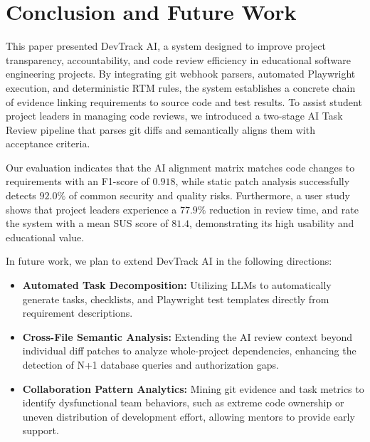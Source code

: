 \section{Conclusion and Future Work}
\label{sec:conclusion}

This paper presented DevTrack AI, a system designed to improve project transparency, accountability, and code review efficiency in educational software engineering projects. By integrating git webhook parsers, automated Playwright execution, and deterministic RTM rules, the system establishes a concrete chain of evidence linking requirements to source code and test results. To assist student project leaders in managing code reviews, we introduced a two-stage AI Task Review pipeline that parses git diffs and semantically aligns them with acceptance criteria.

Our evaluation indicates that the AI alignment matrix matches code changes to requirements with an F1-score of $0.918$, while static patch analysis successfully detects $92.0\%$ of common security and quality risks. Furthermore, a user study shows that project leaders experience a $77.9\%$ reduction in review time, and rate the system with a mean SUS score of $81.4$, demonstrating its high usability and educational value.

In future work, we plan to extend DevTrack AI in the following directions:
\begin{itemize}
    \item \textbf{Automated Task Decomposition:} Utilizing LLMs to automatically generate tasks, checklists, and Playwright test templates directly from requirement descriptions.
    \item \textbf{Cross-File Semantic Analysis:} Extending the AI review context beyond individual diff patches to analyze whole-project dependencies, enhancing the detection of N+1 database queries and authorization gaps.
    \item \textbf{Collaboration Pattern Analytics:} Mining git evidence and task metrics to identify dysfunctional team behaviors, such as extreme code ownership or uneven distribution of development effort, allowing mentors to provide early support.
\end{itemize}
